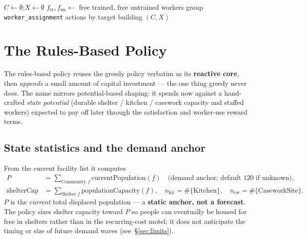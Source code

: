 \documentclass[11pt]{article}
\newcommand{\unity}[1]{{\color{unityblue}\texttt{\small #1}}}
\newcommand{\py}[1]{{\color{pyorange}\texttt{\small #1}}}
\begin{document}
\begin{algorithm}[h]
\DontPrintSemicolon
{}
$C \leftarrow \emptyset$;\quad $X \leftarrow \emptyset$\;
$f_{\mathrm{tr}}, f_{\mathrm{un}} \leftarrow$ free trained, free untrained workers\;
group \unity{worker\_assignment} actions by target building\;
\Return $(C, X)$ 
\caption{\textsc{GreedyPolicy} (\py{greedy\_decision})}
\label{alg:greedy}
\end{algorithm}

\section{The Rules-Based Policy}

The rules-based policy reuses the greedy policy verbatim as its \textbf{reactive core}, then
\emph{appends} a small amount of capital investment --- the one thing greedy never does. The name
mirrors potential-based shaping: it spends now against a hand-crafted \emph{state potential}
(durable shelter / kitchen / casework capacity and staffed workers) expected to pay off later
through the satisfaction and worker-use reward terms.

\subsection{State statistics and the demand anchor}
From the current facility list it computes
\begin{align}
P &= \textstyle\sum_{\text{Community }f} \text{currentPopulation}(f) \quad\text{(demand anchor; default 120 if unknown)}, \\
\text{shelterCap} &= \textstyle\sum_{\text{Shelter }f} \text{populationCapacity}(f), \quad
n_{\text{kit}} = \#\{\text{Kitchen}\}, \quad
n_{\text{cw}} = \#\{\text{CaseworkSite}\}.
\end{align}
$P$ is the \emph{current} total displaced population --- a \textbf{static anchor, not a forecast}.
The policy sizes shelter capacity toward $P$ so people can eventually be housed for free in
shelters rather than in the recurring-cost motel; it does not anticipate the timing or size of
future demand waves (see~\S\ref{sec:limits}).
\end{document}
